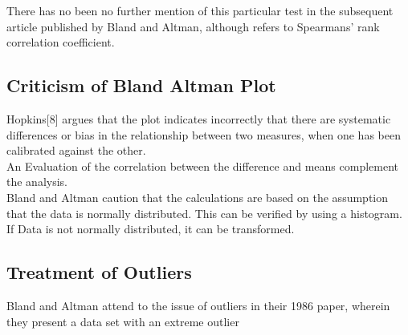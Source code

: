 \documentclass[Chap2main.tex]{subfiles}
\begin{document}
	There has no been no further mention of this particular test in
	the subsequent article published by Bland and Altman, although
	\citet{BA99} refers to Spearmans' rank correlation coefficient.
	
	\subsection{Criticism of Bland Altman Plot}
	Hopkins[$8$] argues that the plot indicates incorrectly that there
	are systematic differences or bias in the relationship between two
	measures, when one has been calibrated against the other.
	\\
	An Evaluation of the correlation between the difference and means
	complement the analysis.
	\\
	Bland and Altman caution that the calculations are based on the
	assumption that the data is normally distributed. This can be
	verified by using a histogram. If Data is not normally
	distributed, it can be transformed.
	\newpage
	\subsection{Treatment of Outliers}
	Bland and Altman attend to the issue of outliers in their 1986 paper, wherein they present a data set with an extreme outlier
\end{document}
